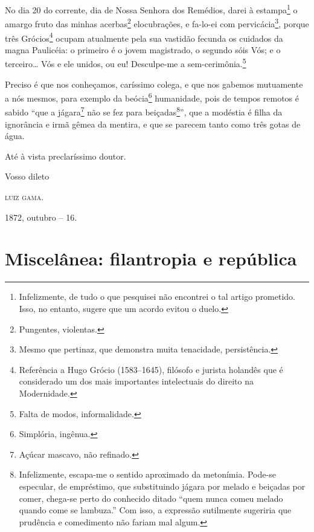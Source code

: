 No dia 20 do corrente, dia de Nossa Senhora dos Remédios, darei à
estampa\footnote{ Infelizmente, de tudo o que pesquisei não encontrei o
  tal artigo prometido. Isso, no entanto, sugere que um acordo evitou o
  duelo.} o amargo fruto das minhas acerbas\footnote{ Pungentes,
  violentas.} elocubrações, e fa-lo-ei com pervicácia\footnote{ Mesmo
  que pertinaz, que demonstra muita tenacidade, persistência.}, porque
três Grócios\footnote{ Referência a Hugo Grócio (1583--1645), filósofo e
  jurista holandês que é considerado um dos mais importantes
  intelectuais do direito na Modernidade.} ocupam atualmente pela sua
vastidão fecunda os cuidados da magna Paulicéia: o primeiro é o jovem
magistrado, o segundo sóis Vós; e o terceiro\ldots{} Vós e ele unidos, ou eu!
Desculpe-me a sem-cerimônia.\footnote{ Falta de modos, informalidade.}

Preciso é que nos conheçamos, caríssimo colega, e que nos gabemos
mutuamente a nós mesmos, para exemplo da beócia\footnote{ Simplória,
  ingênua.} humanidade, pois de tempos remotos é sabido ``que a
jágara\footnote{ Açúcar mascavo, não refinado.} não se fez para
beiçadas\footnote{ Infelizmente, escapa-me o sentido aproximado da
  metonímia. Pode-se especular, de empréstimo, que substituindo jágara
  por melado e beiçadas por comer, chega-se perto do conhecido ditado
  ``quem nunca comeu melado quando come se lambuza.'' Com isso, a
  expressão sutilmente sugeriria que prudência e comedimento não fariam
  mal algum.}'', que a modéstia é filha da ignorância e irmã gêmea da
mentira, e que se parecem tanto como três gotas de água.

Até à vista preclaríssimo doutor.

Vosso dileto

\textsc{luiz gama}.

1872, outubro -- 16.

\part{Miscelânea: filantropia e república}

